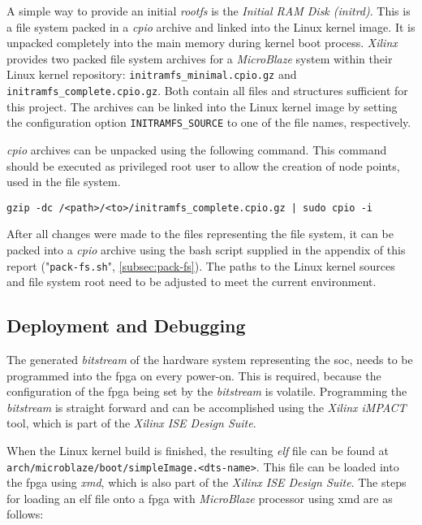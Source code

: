 A simple way to provide an initial \textit{rootfs} is the \textit{Initial RAM Disk (initrd)}. This is a file system packed in a \textit{cpio} archive and linked into the Linux kernel image. It is unpacked completely into the main memory during kernel boot process. \textit{Xilinx} provides two packed file system archives for a \textit{MicroBlaze} system within their Linux kernel repository: \texttt{initramfs\_minimal.cpio.gz} and \texttt{initramfs\_complete.cpio.gz}. Both contain all files and structures sufficient for this project. The archives can be linked into the Linux kernel image by setting the configuration option \texttt{INITRAMFS\_SOURCE} to one of the file names, respectively.

\textit{cpio} archives can be unpacked using the following command. This command should be executed as privileged root user to allow the creation of node points, used in the file system.

\begin{verbatim}
gzip -dc /<path>/<to>/initramfs_complete.cpio.gz | sudo cpio -i
\end{verbatim}

After all changes were made to the files representing the file system, it can be packed into a \textit{cpio} archive using the bash script supplied in the appendix of this report ("\texttt{pack-fs.sh}", \ref{subsec:pack-fs}). The paths to the Linux kernel sources and file system root need to be adjusted to meet the current environment.


\subsection{Deployment and Debugging}

The generated \textit{bitstream} of the hardware system representing the \gls{soc}, needs to be programmed into the \gls{fpga} on every power-on. This is required, because the configuration of the \gls{fpga} being set by the \textit{bitstream} is volatile. Programming the \textit{bitstream} is straight forward and can be accomplished using the \textit{Xilinx iMPACT} tool, which is part of the \textit{Xilinx ISE Design Suite}.

When the Linux kernel build is finished, the resulting \textit{\gls{elf}} file can be found at \texttt{arch/microblaze/boot/simpleImage.<dts-name>}. This file can be loaded into the \gls{fpga} using \textit{\gls{xmd}}, which is also part of the \textit{Xilinx ISE Design Suite}. The steps for loading an \gls{elf} file onto a \gls{fpga} with \textit{MicroBlaze} processor using \gls{xmd} are as follows:

